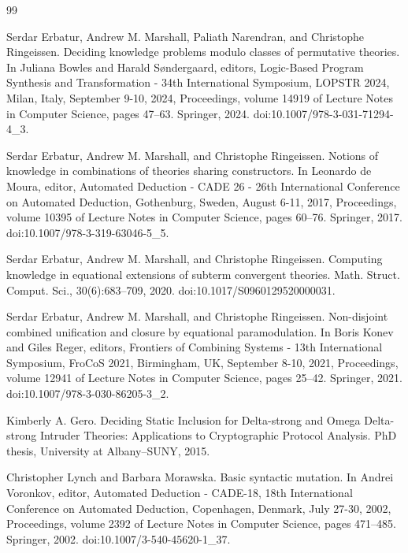\documentclass[10pt,a4paper]{amsart}
\begin{document}
\begin{thebibliography}{99}
\par\noindent  [15]  Serdar Erbatur, Andrew M. Marshall, Paliath Narendran, and Christophe Ringeissen.  Deciding knowledge problems modulo classes of permutative theories.  In Juliana Bowles and Harald Søndergaard, editors, Logic-Based Program Synthesis and Transformation - 34th International Symposium, LOPSTR 2024, Milan, Italy, September 9-10, 2024, Proceedings, volume 14919 of Lecture Notes in Computer Science, pages 47–63. Springer, 2024.  doi:10.1007/978-3-031-71294-4\_3.  
 
\par\noindent  [16]  Serdar Erbatur, Andrew M. Marshall, and Christophe Ringeissen.  Notions of knowledge in combinations of theories sharing constructors.  In Leonardo de Moura, editor, Automated Deduction - CADE 26 - 26th International Conference on Automated Deduction, Gothenburg, Sweden, August 6-11, 2017, Proceedings, volume 10395 of Lecture Notes in Computer Science, pages 60–76. Springer, 2017.  doi:10.1007/978-3-319-63046-5\_5.  
 
\par\noindent  [17]  Serdar Erbatur, Andrew M. Marshall, and Christophe Ringeissen.  Computing knowledge in equational extensions of subterm convergent theories.  Math. Struct. Comput. Sci., 30(6):683–709, 2020.  doi:10.1017/S0960129520000031.  
 
\par\noindent  [18]  Serdar Erbatur, Andrew M. Marshall, and Christophe Ringeissen.  Non-disjoint combined unification and closure by equational paramodulation.  In Boris Konev and Giles Reger, editors, Frontiers of Combining Systems - 13th International Symposium, FroCoS 2021, Birmingham, UK, September 8-10, 2021, Proceedings, volume 12941 of Lecture Notes in Computer Science, pages 25–42. Springer, 2021.  doi:10.1007/978-3-030-86205-3\_2.  
 
\par\noindent  [19]  Kimberly A. Gero.  Deciding Static Inclusion for Delta-strong and Omega Delta-strong Intruder Theories: Applications to Cryptographic Protocol Analysis.  PhD thesis, University at Albany–SUNY, 2015.  
 
\par\noindent  [20]  Christopher Lynch and Barbara Morawska.  Basic syntactic mutation.  In Andrei Voronkov, editor, Automated Deduction - CADE-18, 18th International Conference on Automated Deduction, Copenhagen, Denmark, July 27-30, 2002, Proceedings, volume 2392 of Lecture Notes in Computer Science, pages 471–485. Springer, 2002.  doi:10.1007/3-540-45620-1\_37.  
 

\end{thebibliography}
\end{document}
